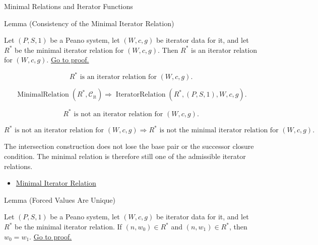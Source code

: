 \begin{topicbox}{Minimal Relations and Iterator Functions}
\begin{lemmabox}{Lemma (Consistency of the Minimal Iterator Relation)}
\begin{lemma}
\label{lem:iterator-relation-consistency}
Let $(P,S,1)$ be a Peano system, let $(W,c,g)$ be iterator data for it, and let
$R^*$ be the minimal iterator relation for $(W,c,g)$. Then $R^*$ is an
iterator relation for $(W,c,g)$.
\hyperref[prf:iterator-relation-consistency]{Go to proof.}
\end{lemma}
\end{lemmabox}

\begin{remark*}
\[
R^* \text{ is an iterator relation for } (W,c,g).
\]
\end{remark*}

\begin{remark*}
\[
\operatorname{MinimalRelation}(R^*,\mathcal C_{\mathrm{it}})
\Longrightarrow
\operatorname{IteratorRelation}(R^*,(P,S,1),W,c,g).
\]
\end{remark*}

\begin{remark*}
\[
R^* \text{ is not an iterator relation for } (W,c,g).
\]
\end{remark*}

\begin{remark*}
\[
R^* \text{ is not an iterator relation for } (W,c,g)
\Longrightarrow
R^* \text{ is not the minimal iterator relation for } (W,c,g).
\]
\end{remark*}

\begin{remark*}[Interpretation]
The intersection construction does not lose the base pair or the successor
closure condition. The minimal relation is therefore still one of the
admissible iterator relations.
\end{remark*}

\begin{dependencies}
\begin{itemize}
  \item \hyperref[def:minimal-iterator-relation]{Minimal Iterator Relation}
\end{itemize}
\end{dependencies}

\begin{lemmabox}{Lemma (Forced Values Are Unique)}
\begin{lemma}
\label{lem:forced-values-are-unique}
Let $(P,S,1)$ be a Peano system, let $(W,c,g)$ be iterator data for it, and let
$R^*$ be the minimal iterator relation. If $(n,w_0)\in R^*$ and
$(n,w_1)\in R^*$, then $w_0=w_1$.
\hyperref[prf:forced-values-are-unique]{Go to proof.}
\end{lemma}
\end{lemmabox}


\end{topicbox}
